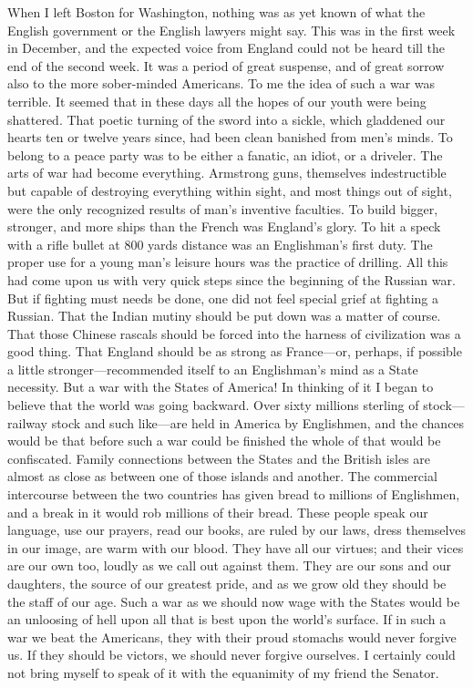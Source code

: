 When I left Boston for Washington, nothing was as yet known of what
the English government or the English lawyers might say.  This was
in the first week in December, and the expected voice from England
could not be heard till the end of the second week.  It was a
period of great suspense, and of great sorrow also to the more
sober-minded Americans.  To me the idea of such a war was terrible.
It seemed that in these days all the hopes of our youth were being
shattered.  That poetic turning of the sword into a sickle, which
gladdened our hearts ten or twelve years since, had been clean
banished from men's minds.  To belong to a peace party was to be
either a fanatic, an idiot, or a driveler.  The arts of war had
become everything.  Armstrong guns, themselves indestructible but
capable of destroying everything within sight, and most things out
of sight, were the only recognized results of man's inventive
faculties.  To build bigger, stronger, and more ships than the
French was England's glory.  To hit a speck with a rifle bullet at
800 yards distance was an Englishman's first duty.  The proper use
for a young man's leisure hours was the practice of drilling.  All
this had come upon us with very quick steps since the beginning of
the Russian war.  But if fighting must needs be done, one did not
feel special grief at fighting a Russian.  That the Indian mutiny
should be put down was a matter of course.  That those Chinese
rascals should be forced into the harness of civilization was a
good thing.  That England should be as strong as France---or,
perhaps, if possible a little stronger---recommended itself to an
Englishman's mind as a State necessity.  But a war with the States
of America!  In thinking of it I began to believe that the world
was going backward.  Over sixty millions sterling of stock---railway
stock and such like---are held in America by Englishmen, and the
chances would be that before such a war could be finished the whole
of that would be confiscated.  Family connections between the
States and the British isles are almost as close as between one of
those islands and another.  The commercial intercourse between the
two countries has given bread to millions of Englishmen, and a
break in it would rob millions of their bread.  These people speak
our language, use our prayers, read our books, are ruled by our
laws, dress themselves in our image, are warm with our blood.  They
have all our virtues; and their vices are our own too, loudly as we
call out against them.  They are our sons and our daughters, the
source of our greatest pride, and as we grow old they should be the
staff of our age.  Such a war as we should now wage with the States
would be an unloosing of hell upon all that is best upon the
world's surface.  If in such a war we beat the Americans, they with
their proud stomachs would never forgive us.  If they should be
victors, we should never forgive ourselves.  I certainly could not
bring myself to speak of it with the equanimity of my friend the
Senator.

